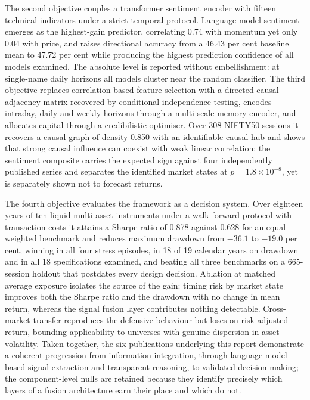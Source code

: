 The second objective couples a transformer sentiment encoder with fifteen technical indicators
under a strict temporal protocol. Language-model sentiment emerges as the highest-gain
predictor, correlating 0.74 with momentum yet only 0.04 with price, and raises directional
accuracy from a 46.43 per cent baseline mean to 47.72 per cent while producing the highest
prediction confidence of all models examined. The absolute level is reported without
embellishment: at single-name daily horizons all models cluster near the random classifier. The
third objective replaces correlation-based feature selection with a directed causal adjacency
matrix recovered by conditional independence testing, encodes intraday, daily and weekly
horizons through a multi-scale memory encoder, and allocates capital through a credibilistic
optimiser. Over 308 NIFTY50 sessions it recovers a causal graph of density 0.850 with an
identifiable causal hub and shows that strong causal influence can coexist with weak linear
correlation; the sentiment composite carries the expected sign against four independently
published series and separates the identified market states at $p = 1.8 \times 10^{-8}$, yet is
separately shown not to forecast returns.

The fourth objective evaluates the framework as a decision system. Over eighteen years of ten
liquid multi-asset instruments under a walk-forward protocol with transaction costs it attains a
Sharpe ratio of 0.878 against 0.628 for an equal-weighted benchmark and reduces maximum drawdown
from $-36.1$ to $-19.0$ per cent, winning in all four stress episodes, in 18 of 19 calendar
years on drawdown and in all 18 specifications examined, and beating all three benchmarks on a
665-session holdout that postdates every design decision. Ablation at matched average exposure
isolates the source of the gain: timing risk by market state improves both the Sharpe ratio and
the drawdown with no change in mean return, whereas the signal fusion layer contributes nothing
detectable. Cross-market transfer reproduces the defensive behaviour but loses on risk-adjusted
return, bounding applicability to universes with genuine dispersion in asset volatility. Taken
together, the six publications underlying this report demonstrate a coherent progression from
information integration, through language-model-based signal extraction and transparent
reasoning, to validated decision making; the component-level nulls are retained because they
identify precisely which layers of a fusion architecture earn their place and which do not.

